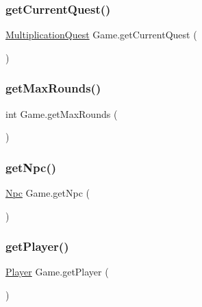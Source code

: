 \mbox{\label{classGame_a4df0125f52073de2cdc4d048a3db792a}} 
\subsubsection{\texorpdfstring{get\+Current\+Quest()}{getCurrentQuest()}}
{\footnotesize\ttfamily \hyperlink{classMultiplicationQuest}{Multiplication\+Quest} Game.\+get\+Current\+Quest (\begin{DoxyParamCaption}{ }\end{DoxyParamCaption})\hspace{0.3cm}{\ttfamily [inline]}}

\mbox{\label{classGame_af4e27e50ead6b1204fded03ab13bc136}} 
\subsubsection{\texorpdfstring{get\+Max\+Rounds()}{getMaxRounds()}}
{\footnotesize\ttfamily int Game.\+get\+Max\+Rounds (\begin{DoxyParamCaption}{ }\end{DoxyParamCaption})\hspace{0.3cm}{\ttfamily [inline]}}

\mbox{\label{classGame_ac57921413d0a3222c8c514483ba74c3f}} 
\subsubsection{\texorpdfstring{get\+Npc()}{getNpc()}}
{\footnotesize\ttfamily \hyperlink{classNpc}{Npc} Game.\+get\+Npc (\begin{DoxyParamCaption}{ }\end{DoxyParamCaption})\hspace{0.3cm}{\ttfamily [inline]}}

\mbox{\label{classGame_a9ed9805da9c46d237f0be3274ed37514}} 
\subsubsection{\texorpdfstring{get\+Player()}{getPlayer()}}
{\footnotesize\ttfamily \hyperlink{classPlayer}{Player} Game.\+get\+Player (\begin{DoxyParamCaption}{ }\end{DoxyParamCaption})\hspace{0.3cm}{\ttfamily [inline]}}

